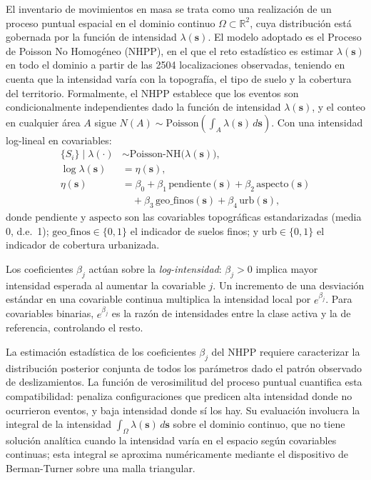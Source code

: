 \documentclass[10pt, twocolumn, letterpaper]{article}
\begin{document}
El inventario de movimientos en masa se trata como una realización de un
proceso puntual espacial en el dominio continuo $\Omega \subset \mathbb{R}^2$,
cuya distribución está gobernada por la función de intensidad
$\lambda(\mathbf{s})$. El modelo adoptado es el Proceso de Poisson No
Homogéneo (NHPP), en el que el reto estadístico es estimar
$\lambda(\mathbf{s})$ en todo el dominio a partir de las \num{2504}
localizaciones observadas, teniendo en cuenta que la intensidad varía con la
topografía, el tipo de suelo y la cobertura del territorio. Formalmente, el
NHPP establece que los eventos son condicionalmente independientes dado la
función de intensidad $\lambda(\mathbf{s})$, y el conteo en cualquier área $A$
sigue $N(A) \sim \text{Poisson}\!\left(\int_A \lambda(\mathbf{s})\,d\mathbf{s}\right)$.
Con una intensidad log-lineal en covariables:
\begin{align}
  \{S_i\} \mid \lambda(\cdot) &\sim
    \text{Poisson-NH}\bigl(\lambda(\mathbf{s})\bigr),
  \label{eq:ipp1}\\
  \log\lambda(\mathbf{s}) &= \eta(\mathbf{s}),
  \label{eq:ipp2}\\
  \eta(\mathbf{s}) &= \beta_0 + \beta_1\,\text{pendiente}(\mathbf{s})
    + \beta_2\,\text{aspecto}(\mathbf{s})\nonumber\\
    &\quad + \beta_3\,\text{geo\_finos}(\mathbf{s})
    + \beta_4\,\text{urb}(\mathbf{s}),
  \label{eq:ipp}
\end{align}
donde $\text{pendiente}$ y $\text{aspecto}$ son las covariables topográficas
estandarizadas (media 0, d.e.\ 1); $\text{geo\_finos} \in \{0,1\}$ el
indicador de suelos finos; y $\text{urb} \in \{0,1\}$ el indicador de
cobertura urbanizada.

Los coeficientes $\beta_j$ actúan sobre la \emph{log-intensidad}:
$\beta_j > 0$ implica mayor intensidad esperada al aumentar la covariable $j$.
Un incremento de una desviación estándar en una covariable continua multiplica
la intensidad local por $e^{\beta_j}$. Para covariables binarias, $e^{\beta_j}$
es la razón de intensidades entre la clase activa y la de referencia,
controlando el resto.

La estimación estadística de los coeficientes $\beta_j$ del NHPP requiere
caracterizar la distribución posterior conjunta de todos los parámetros dado el
patrón observado de deslizamientos. La función de verosimilitud del proceso
puntual cuantifica esta compatibilidad: penaliza configuraciones que predicen
alta intensidad donde no ocurrieron eventos, y baja intensidad donde sí los
hay. Su evaluación involucra la integral de la intensidad
$\int_\Omega \lambda(\mathbf{s})\,d\mathbf{s}$ sobre el dominio continuo, que
no tiene solución analítica cuando la intensidad varía en el espacio según
covariables continuas; esta integral se aproxima numéricamente mediante el
dispositivo de Berman-Turner \cite{diggle2013} sobre una malla triangular.
\end{document}

